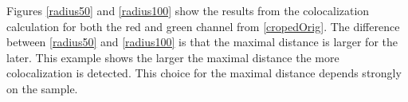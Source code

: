 Figures \ref{radius50} and \ref{radius100} show the results from the colocalization calculation for both the red and green channel from \ref{cropedOrig}. The difference between \ref{radius50} and \ref{radius100} is that the maximal distance is larger for the later. This example shows the larger the maximal distance the more colocalization is detected. This choice for the maximal distance depends strongly on the sample.







